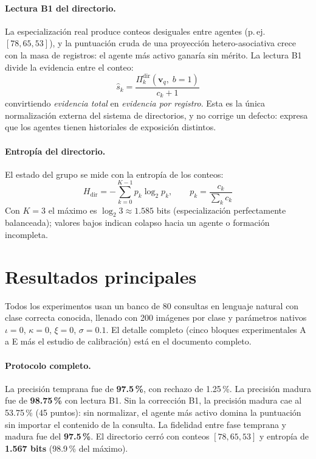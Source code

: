 \documentclass[11pt]{article}
\begin{document}
\paragraph{Lectura B1 del directorio.}
La especialización real produce conteos desiguales entre agentes (p.\,ej.\
$[78, 65, 53]$), y la puntuación cruda de una proyección hetero-asociativa crece con
la masa de registros: el agente más activo ganaría sin mérito.
La lectura B1 divide la evidencia entre el conteo:
\begin{equation}
    \hat{s}_k = \frac{\Pi^{\mathrm{dir}}_k(\mathbf{v}_q,\; b{=}1)}{c_k + 1}
    \label{eq:b1}
\end{equation}
convirtiendo \emph{evidencia total} en \emph{evidencia por registro}.
Esta es la única normalización externa del sistema de directorios, y no corrige
un defecto: expresa que los agentes tienen historiales de exposición distintos.

\paragraph{Entropía del directorio.}
El estado del grupo se mide con la entropía de los conteos:
\begin{equation}
    H_{\mathrm{dir}} = -\sum_{k=0}^{K-1} p_k \log_2 p_k,
    \qquad p_k = \frac{c_k}{\sum_k c_k}
    \label{eq:entropia-dir}
\end{equation}
Con $K{=}3$ el máximo es $\log_2 3 \approx 1.585$ bits (especialización
perfectamente balanceada); valores bajos indican colapso hacia un agente o
formación incompleta.

\section{Resultados principales}

Todos los experimentos usan un banco de 80 consultas en lenguaje natural con
clase correcta conocida, llenado con 200 imágenes por clase y parámetros nativos
$\iota = 0$, $\kappa = 0$, $\xi = 0$, $\sigma = 0.1$.
El detalle completo (cinco bloques experimentales A a E más el estudio de
calibración) está en el documento completo.

\paragraph{Protocolo completo.}
La precisión temprana fue de \textbf{97.5\,\%}, con rechazo de 1.25\,\%.
La precisión madura fue de \textbf{98.75\,\%} con lectura B1.
Sin la corrección B1, la precisión madura cae al 53.75\,\% (45 puntos): sin
normalizar, el agente más activo domina la puntuación sin importar el contenido
de la consulta.
La fidelidad entre fase temprana y madura fue del \textbf{97.5\,\%}.
El directorio cerró con conteos $[78, 65, 53]$ y entropía de
\textbf{1.567 bits} (98.9\,\% del máximo).
\end{document}
